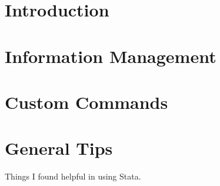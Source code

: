 \documentclass[12pt, a4paper]{article}
\begin{document}


\tableofcontents
{}

\newcommand{\sectionbreak}{%
  \par%
  \begin{center}---\texttt{*}---\end{center}%
  \clearpage%
}%

\section{Introduction}



\section{Information Management}



\section{Custom Commands}



\section{General Tips}

Things I found helpful in using Stata.
\end{document}
